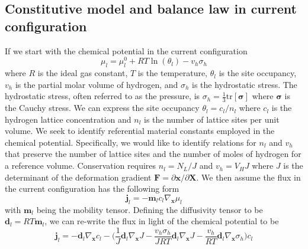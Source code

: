 \documentclass[10pt]{elsarticle}
\newcommand{\mbs}[1]{\boldsymbol{#1}}
\def\bs{{\mbs{s}}} \def\bt{{\mbs{t}}} \def\bu{{\mbs{u}}}
\def\bs{\boldsymbol}
\begin{document}
\subsection{Constitutive model and balance law in current configuration} If we start with the chemical potential in the current configuration
\begin{equation}
\label{eq.chemical.potential}{\mu_{l} = \mu_{l}^{0} + R T \ln(\theta_{l}) - v_{h} \sigma_{h}}
\end{equation}
where $R$ is the ideal gas constant, $T$ is the temperature, $\theta_{l}$ is the site occupancy, $v_{h}$ is the partial molar volume of hydrogen, and $\sigma_{h}$ is the hydrostatic stress. The hydrostatic stress, often referred to as the pressure, is $\sigma_{h} = \frac {1} {3} \text{tr}[\bs{\sigma}]$ where $\bs{\sigma}$ is the Cauchy stress. We can express the site occupancy $\theta_{l} = c_{l}/n_{l}$ where $c_{l}$ is the hydrogen lattice concentration and $n_{l}$ is the number of lattice sites per unit volume. We seek to identify referential material constants employed in the chemical potential. Specifically, we would like to identify relations for $n_{l}$ and $v_{h}$ that preserve the number of lattice sites and the number of moles of hydrogen for a reference volume. Conservation requires $n_{l} = N_{L}/J$ and $v_{h} = V_{H}J$ where $J$ is the determinant of the deformation gradient $\bs{F} = \partial \bs{x} / \partial \bs{X}$. We then assume the flux in the current configuration has the following form
%
\begin{equation}
\label{eq.flux}{\bs{j}_{l} = -\bs{m}_{l} c_{l} \nabla_{\bs{x}}\mu_{l}}
\end{equation}
%
with $\bs{m}_{l}$ being the mobility tensor. Defining the diffusivity tensor to be $\bs{d}_{l} = R T \bs{m}_{l} $, we can re-write the flux in light of the chemical potential to be 
\begin{equation}
\label{eq.flux2}{\bs{j}_{l} = -\bs{d}_{l}  \nabla_{\bs{x}}c_{l} - \bigg(\frac{1}{J} \bs{d}_{l} \nabla_{\bs{x}}J -  \frac{v_{h}\sigma_{h}}{JRT} \bs{d}_{l} \nabla_{\bs{x}}J} - \frac{v_{h}}{R T} \bs{d}_{l} \nabla_{\bs{x}} \sigma_{h} \bigg)c_{l}
\end{equation}
\end{document}
